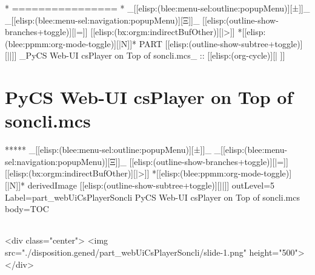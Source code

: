 \begin{whenOrg}
*      ================
*  _[[elisp:(blee:menu-sel:outline:popupMenu)][±]]_ _[[elisp:(blee:menu-sel:navigation:popupMenu)][Ξ]]_ [[elisp:(outline-show-branches+toggle)][|=]] [[elisp:(bx:orgm:indirectBufOther)][|>]] *[[elisp:(blee:ppmm:org-mode-toggle)][|N]]*  PART       [[elisp:(outline-show-subtree+toggle)][||]]   _PyCS Web-UI csPlayer on Top of soncli.mcs_ ::  [[elisp:(org-cycle)][| ]]
\end{whenOrg}

\newpage
\part{PyCS Web-UI csPlayer on Top of soncli.mcs}


\begin{whenOrg}
*****  _[[elisp:(blee:menu-sel:outline:popupMenu)][±]]_ _[[elisp:(blee:menu-sel:navigation:popupMenu)][Ξ]]_ [[elisp:(outline-show-branches+toggle)][|=]] [[elisp:(bx:orgm:indirectBufOther)][|>]] *[[elisp:(blee:ppmm:org-mode-toggle)][|N]]*  derivedImage [[elisp:(outline-show-subtree+toggle)][||]] outLevel=5 Label=part_webUiCsPlayerSoncli PyCS Web-UI csPlayer on Top of soncli.mcs body=TOC

\end{whenOrg}

\begin{htmlonly}

\begin{frame}[fragile,plain,label=part_webUiCsPlayerSoncli]
    \frametitle{}
    \framesubtitle{}
    \begin{rawhtml}
<div class="center">
<img src="./disposition.gened/part_webUiCsPlayerSoncli/slide-1.png" height="500">
</div>
    \end{rawhtml}
\end{frame}
\end{htmlonly}

